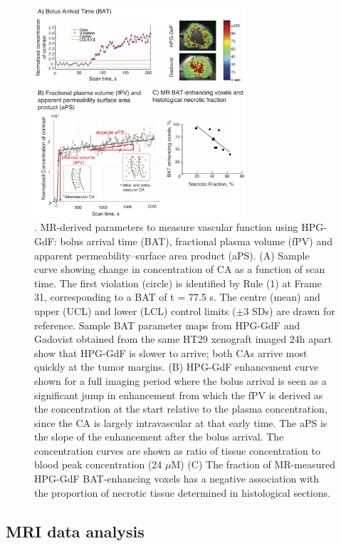 \begin{figure}[htbp]   
 \begin{center}  
 \includegraphics[width=0.7\textwidth]{hpg/hpg-images/hpg_fig2-bat.png}
 \caption{. MR-derived parameters to measure vascular function using HPG-GdF: bolus arrival time (BAT), fractional plasma volume (fPV) and apparent permeability–surface area product (aPS). (A) Sample curve showing change in concentration of CA as a function of scan time. The first violation (circle) is identified by Rule (1) at Frame 31, corresponding to a BAT of t = 77.5 s. The centre (mean) and upper (UCL) and lower (LCL) control limits ($\pm$3 SDs) are drawn for reference. Sample BAT parameter maps from HPG-GdF and Gadovist obtained from the same HT29 xenograft imaged 24h apart show that HPG-GdF is slower to arrive; both CAs arrive most quickly at the tumor margins. (B) HPG-GdF enhancement curve shown for a full imaging period where the bolus arrival is seen as a significant jump in enhancement from which the fPV is derived as the concentration at the start relative to the plasma concentration, since the CA is largely intravascular at that early time. The aPS is the slope of the enhancement after the bolus arrival. The concentration curves are shown as ratio of tissue concentration to blood peak concentration (24 $\mu$M) (C) The fraction of MR-measured HPG-GdF BAT-enhancing voxels has a negative association with the proportion of necrotic tissue determined in histological sections.}  
 \label{hpgpaper:fig2}  
 \end{center}
\end{figure}

\subsection{MRI data analysis}

